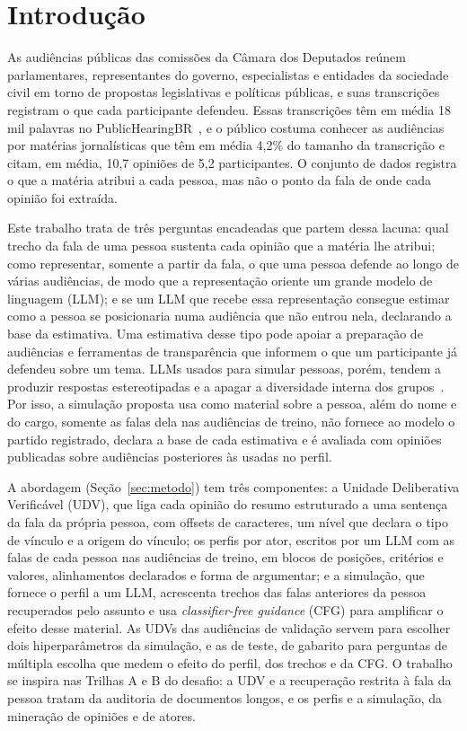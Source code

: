 \section{Introdu\c{c}\~ao}
\label{sec:introducao}

As audiências públicas das comissões da Câmara dos Deputados reúnem parlamentares, representantes
do governo, especialistas e entidades da sociedade civil em torno de propostas legislativas e
políticas públicas, e suas transcrições registram o que cada participante defendeu. Essas
transcrições têm em média 18 mil palavras no PublicHearingBR~\citep{fernandes2024publichearingbr}, e o
público costuma conhecer as audiências por matérias jornalísticas que têm em média 4,2\% do tamanho
da transcrição e citam, em média, 10,7 opiniões de 5,2 participantes. O conjunto de dados registra o
que a matéria atribui a cada pessoa, mas não o ponto da fala de onde cada opinião foi extraída.

Este trabalho trata de três perguntas encadeadas que partem dessa lacuna: qual trecho da fala de uma
pessoa sustenta cada opinião que a matéria lhe atribui; como representar, somente a partir da fala,
o que uma pessoa defende ao longo de várias audiências, de modo que a representação oriente um grande
modelo de linguagem (LLM); e se um LLM que recebe essa representação consegue estimar como a pessoa
se posicionaria numa audiência que não entrou nela, declarando a base da estimativa. Uma estimativa
desse tipo pode apoiar a preparação de audiências e ferramentas de transparência que informem o que
um participante já defendeu sobre um tema. LLMs usados para simular pessoas, porém, tendem a produzir
respostas estereotipadas e a apagar a diversidade interna dos
grupos~\citep{bisbee2024synthetic,wang2025large}. Por isso, a simulação proposta usa como material
sobre a pessoa, além do nome e do cargo, somente as falas dela nas audiências de treino, não fornece
ao modelo o partido registrado, declara a base de cada estimativa e é avaliada com opiniões
publicadas sobre audiências posteriores às usadas no perfil.

A abordagem (Seção~\ref{sec:metodo}) tem três componentes: a Unidade Deliberativa Verificável (UDV),
que liga cada opinião do resumo estruturado a uma sentença da fala da própria pessoa, com offsets de
caracteres, um nível que declara o tipo de vínculo e a origem do vínculo; os perfis por ator, escritos
por um LLM com as falas de cada pessoa nas audiências de treino, em blocos de posições, critérios e
valores, alinhamentos declarados e forma de argumentar; e a simulação, que fornece o perfil a um LLM,
acrescenta trechos das falas anteriores da pessoa recuperados pelo assunto e usa
\textit{classifier-free guidance} (CFG) para amplificar o efeito desse material. As UDVs das
audiências de validação servem para escolher dois hiperparâmetros da simulação, e as de teste, de
gabarito para perguntas de múltipla escolha que medem o efeito do perfil, dos trechos e da CFG. O
trabalho se inspira nas Trilhas A e B do desafio: a UDV e a recuperação restrita à fala da pessoa
tratam da auditoria de documentos longos, e os perfis e a simulação, da mineração de opiniões e de
atores.


